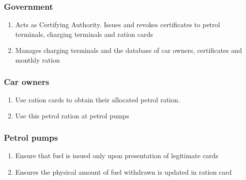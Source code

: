 
\subsubsection{Government}
\begin{enumerate}
  \item Acts as Certifying Authority. Issues and revokes certificates to petrol terminals, charging terminals and ration cards
  \item Manages charging terminals and the database of car owners, certificates and monthly ration
\end{enumerate}

\subsubsection{Car owners}
\begin{enumerate}
  \item Use ration cards to obtain their allocated petrol ration. 
  \item Use this petrol ration at petrol pumps
\end{enumerate}

\subsubsection{Petrol pumps}
\begin{enumerate}
  \item Ensure that fuel is issued only upon presentation of legitimate cards
  \item Ensures the physical amount of fuel withdrawn is updated in ration card
\end{enumerate}

